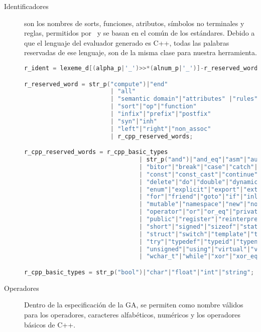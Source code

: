 \begin{description}
\item [Identificadores] son los nombres de sorts, funciones, atributos, símbolos no terminales y reglas, permitidos por \maggen\ y se basan en el común de los estándares. Debido a que el lenguaje del evaluador generado es C++, todas las palabras reservadas de ese lenguaje, son de la misma clase para nuestra herramienta.

\begin{lstlisting}[float=h!, language=C++, basicstyle=\scriptsize, columns=fullflexible, linewidth=11cm]
r_ident = lexeme_d[(alpha_p|'_')>>*(alnum_p|'_')]-r_reserved_word;

r_reserved_word = str_p("compute")|"end"
                        | "all"
                        | "semantic domain"|"attributes" |"rules"
                        | "sort"|"op"|"function"
                        | "infix"|"prefix"|"postfix"
                        | "syn"|"inh"
                        | "left"|"right"|"non_assoc"
                        | r_cpp_reserved_words;

r_cpp_reserved_words = r_cpp_basic_types
                                | str_p("and")|"and_eq"|"asm"|"auto"|"bitand"
                                | "bitor"|"break"|"case"|"catch"|"class"|"compl"
                                | "const"|"const_cast"|"continue"|"default"
                                | "delete"|"do"|"double"|"dynamic_cast"|"else"
                                | "enum"|"explicit"|"export"|"extern"|"false"
                                | "for"|"friend"|"goto"|"if"|"inline"|"long"
                                | "mutable"|"namespace"|"new"|"not"|"not_eq"
                                | "operator"|"or"|"or_eq"|"private"|"protected"
                                | "public"|"register"|"reinterpret_cast"|"return"
                                | "short"|"signed"|"sizeof"|"static"|"static_cast"
                                | "struct"|"switch"|"template"|"this"|"throw"|"true"
                                | "try"|"typedef"|"typeid"|"typename"|"union"
                                | "unsigned"|"using"|"virtual"|"void"|"volatile"
                                | "wchar_t"|"while"|"xor"|"xor_eq";

r_cpp_basic_types = str_p("bool")|"char"|"float"|"int"|"string";
\end{lstlisting}

\item [Operadores] Dentro de la especificación de la GA, se permiten como nombre válidos para los operadores, caracteres alfabéticos, numéricos y los operadores básicos de C++. 


\end{description}
